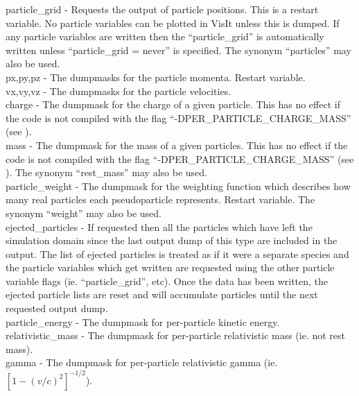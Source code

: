{\emphtext particle\_grid} - Requests the output of particle positions. This
is a restart variable. No particle variables can be plotted in VisIt unless
this is dumped. If any particle variables are written then the
``particle\_grid'' is automatically written unless ``particle\_grid = never''
is specified.
The synonym ``particles'' may also be used.\\

{\emphtext px,\;py,\;pz} - The dumpmasks for the particle momenta. Restart
variable.\\

{\emphtext vx,\;vy,\;vz} - The dumpmasks for the particle velocities.\\

{\emphtext charge} - The dumpmask for the charge of a given particle. This
has no effect if the code is not compiled with the flag
``-DPER\_PARTICLE\_CHARGE\_MASS'' (see ).\\

{\emphtext mass} - The dumpmask for the mass of a given particles. This
has no effect if the code is not compiled with the flag
``-DPER\_PARTICLE\_CHARGE\_MASS'' (see ).
The synonym ``rest\_mass'' may also be used.\\

{\emphtext particle\_weight} - The dumpmask for the weighting function which
describes how many real particles each pseudoparticle represents. Restart
variable.
The synonym ``weight'' may also be used.\\

{\emphtext ejected\_particles} - If requested then all the particles which
  have left the simulation domain since the last output dump of this type are
  included in the output. The list of ejected particles is treated as if
  it were a separate species and the particle variables which get written
  are requested using the other particle variable flags (ie. ``particle\_grid'',
  etc). Once the data has been written, the ejected particle lists are
  reset and will accumulate particles until the next requested output dump.\\

{\emphtext particle\_energy} - The dumpmask for per-particle kinetic energy.\\

{\emphtext relativistic\_mass} - The dumpmask for per-particle relativistic
mass (ie. not rest mass).\\

{\emphtext gamma} - The dumpmask for per-particle relativistic gamma
(ie. $[1-(v/c)^2]^{-1/2}$).\\

